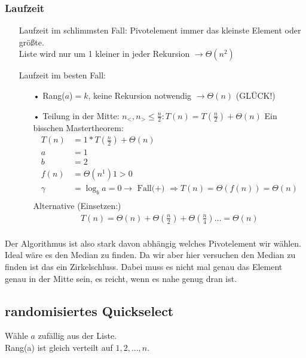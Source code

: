 \subsubsection{Laufzeit}
\begin{enumerate}
\item[Laufzeit im schlimmsten Fall:] Pivotelement immer das kleinste Element oder größte.\\
Liste wird nur um 1 kleiner in jeder Rekursion $\rightarrow \Theta(n^2)$\\
\item[Laufzeit im besten Fall:] \begin{enumerate}
\item[•] Rang($a$)$=k$, keine Rekursion notwendig $\rightarrow \Theta(n)$ (GLÜCK!)\\
\item[•] Teilung in der Mitte: $n_<,n_> \leq \frac{n}{2}: T(n) = T(\frac{n}{2}) + \Theta(n)$
Ein bisschen Mastertheorem:
\begin{align*}
T(n) &= 1*T(\frac{n}{2}) + \Theta(n)\\
a &= 1\\
b &= 2 \\
f(n) &= \Theta(n^1) 1>0\\
\gamma &= \log_b a = 0 \rightarrow \text{ Fall(+) } \Rightarrow T(n) = \Theta(f(n)) = \Theta(n)\\ 
\end{align*}
Alternative (Einsetzen:)
\begin{align*}
T(n) = \Theta(n) + \Theta(\frac{n}{2}) + \Theta(\frac{n}{4}) \dots =  \Theta(n)\\
\end{align*}
\end{enumerate}
\end{enumerate}
Der Algorithmus ist also stark davon abhängig welches Pivotelement wir wählen. Ideal wäre es den Median zu finden. Da wir aber hier versuchen den Median zu finden ist das ein Zirkelschluss. Dabei muss es nicht mal genau das Element genau in der Mitte sein, es reicht, wenn es nahe genug dran ist. \\
\subsection{randomisiertes Quickselect}
Wähle $a$ zufällig aus der Liste.\\
Rang(a) ist gleich verteilt auf ${1,2,...,n}$.
